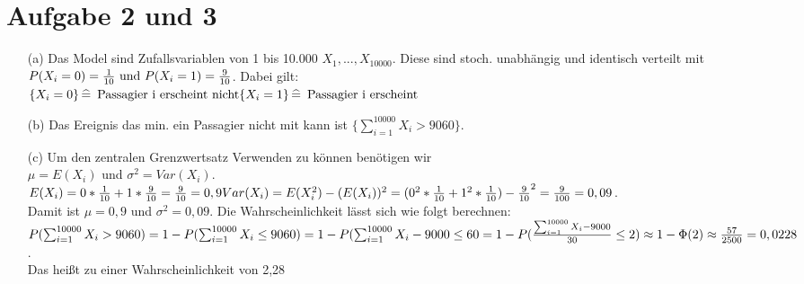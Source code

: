 \documentclass[10pt,a4paper]{article}
\newcommand{\ent}{\mathop{\widehat{=}}}
\begin{document}
\section*{Aufgabe 2 und 3}
\begin{itemize}
\item[(a)] Das Model sind Zufallsvariablen von 1 bis 10.000 $X_1,...,X_10000$. Diese sind stoch. unabhängig und identisch verteilt mit $P(X_i = 0) = \frac{1}{10} \text{ und }\\
P(X_i=1) = \frac{9}{10}$. Dabei gilt:\\
$\{X_i = 0\} \ent \text{ Passagier i erscheint nicht}\\
\{X_i=1\} \ent \text{ Passagier i erscheint}$
\item[(b)] Das Ereignis das min. ein Passagier nicht mit kann ist $\{ \sum\nolimits_{i=1}^{10000} X_i > 9060\}$.
\item[(c)] Um den zentralen Grenzwertsatz Verwenden zu können benötigen wir\\
 $\mu = E(X_i)$ und $\sigma^2 = Var(X_i)$.\\
 $E(X_i) = 0*\frac{1}{10} + 1* \frac{9}{10} = \frac{9}{10} = 0,9 \\
 Var(X_i) = E(X_i^2)-(E(X_i))^2 = (0^2*\frac{1}{10}+1^2*\frac{1}{10})-\frac{9}{10}^2 = \frac{9}{100} = 0,09$. \\
 Damit ist $\mu = 0,9$ und $\sigma^2 = 0,09$. Die Wahrscheinlichkeit lässt sich wie folgt berechnen:\\
$P(\sum\nolimits_{i=1}^{10000} X_i > 9060) = 1 - P(\sum\nolimits_{i=1}^{10000} X_i \leq 9060)\\\\
= 1-P(\sum\nolimits_{i=1}^{10000} X_i-9000 \leq 60\\\\
= 1-P(\frac{\sum\nolimits_{i=1}^{10000} X_i-9000}{30} \leq 2) \\\\
\approx 1-\Phi(2) \approx \frac{57}{2500} = 0,0228$.\\
Das heißt zu einer Wahrscheinlichkeit von 2,28%
\end{itemize}
\end{document}
